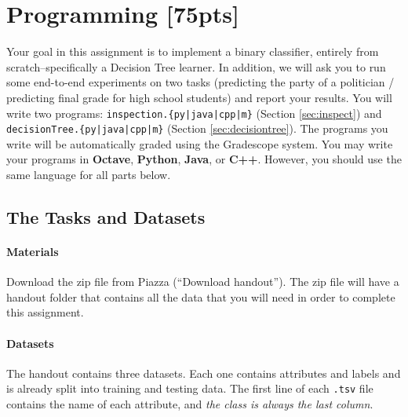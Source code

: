 \section{Programming [75pts]}
\label{sec:programming}

Your goal in this assignment is to implement a binary classifier, entirely from scratch--specifically a Decision Tree learner. In addition, we will ask you to run some end-to-end experiments on two tasks (predicting the party of a politician / predicting final grade for high school students) and report your results.
%
You will write two programs: \texttt{inspection.\{py|java|cpp|m\}} (Section \ref{sec:inspect}) and \texttt{decisionTree.\{py|java|cpp|m\}} (Section \ref{sec:decisiontree}). The programs you write will be automatically graded using the Gradescope system. You may write your programs in \textbf{Octave}, \textbf{Python}, \textbf{Java}, or \textbf{C++}. However, you should use the same language for all parts below.

\subsection{The Tasks and Datasets}
\label{sec:data}

\paragraph{Materials} Download the zip file from Piazza (``Download
  handout''). The zip file will have a handout folder that contains all the data that you will need in order to complete this assignment.

\paragraph{Datasets}

The handout contains three datasets. Each one contains attributes and labels and is already split into training and testing data. The first line of each \lstinline{.tsv} file contains the name of each attribute, and \emph{the class is always the last column}.

